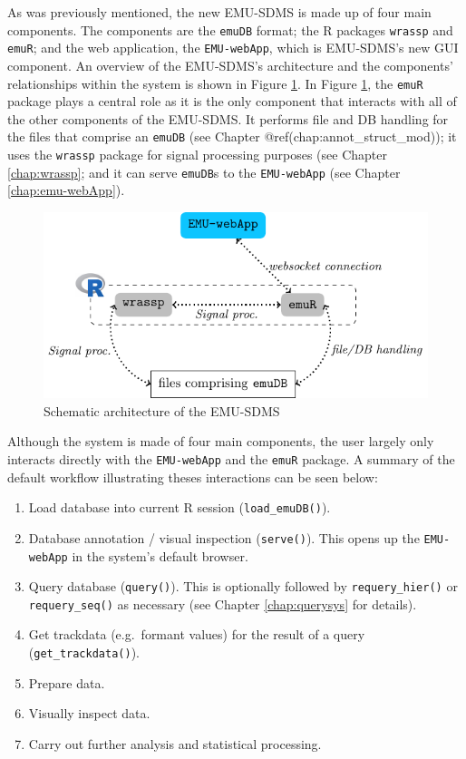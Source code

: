 \documentclass[]{book}
\providecommand{\tightlist}{%
  \setlength{\itemsep}{0pt}\setlength{\parskip}{0pt}}
\theoremstyle{definition}
\theoremstyle{definition}
\theoremstyle{definition}
\theoremstyle{remark}
\begin{document}
As was previously mentioned, the new EMU-SDMS is made up of four main
components. The components are the \texttt{emuDB} format; the R packages
\texttt{wrassp} and \texttt{emuR}; and the web application, the
\texttt{EMU-webApp}, which is EMU-SDMS's new GUI component. An overview
of the EMU-SDMS's architecture and the components' relationships within
the system is shown in Figure \ref{fig:overview-archOver}. In Figure
\ref{fig:overview-archOver}, the \texttt{emuR} package plays a central
role as it is the only component that interacts with all of the other
components of the EMU-SDMS. It performs file and DB handling for the
files that comprise an \texttt{emuDB} (see Chapter
@ref(chap:annot\_struct\_mod)); it uses the \texttt{wrassp} package for
signal processing purposes (see Chapter \ref{chap:wrassp}; and it can
serve \texttt{emuDB}s to the \texttt{EMU-webApp} (see Chapter
\ref{chap:emu-webApp}).

\begin{figure}

{\centering \includegraphics[width=0.75\linewidth]{pics/overview} 

}

\caption{Schematic architecture of the EMU-SDMS}\label{fig:overview-archOver}
\end{figure}

Although the system is made of four main components, the user largely
only interacts directly with the \texttt{EMU-webApp} and the
\texttt{emuR} package. A summary of the default workflow illustrating
theses interactions can be seen below:

\begin{enumerate}
\def\labelenumi{\arabic{enumi}.}
\tightlist
\item
  Load database into current R session (\texttt{load\_emuDB()}).
\item
  Database annotation / visual inspection (\texttt{serve()}). This opens
  up the \texttt{EMU-webApp} in the system's default browser.
\item
  Query database (\texttt{query()}). This is optionally followed by
  \texttt{requery\_hier()} or \texttt{requery\_seq()} as necessary (see
  Chapter \ref{chap:querysys} for details).
\item
  Get trackdata (e.g.~formant values) for the result of a query
  (\texttt{get\_trackdata()}).
\item
  Prepare data.
\item
  Visually inspect data.
\item
  Carry out further analysis and statistical processing.
\end{enumerate}
\end{document}
